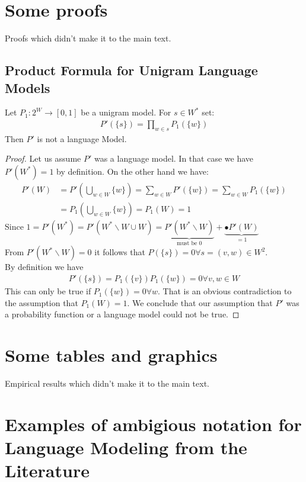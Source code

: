 \documentclass[•]{book}
\begin{document}
\begin{appendix}
\chapter{Some proofs}\label{a:proofs}
Proofs which didn't make it to the main text.
\section*{Product Formula for Unigram Language Models}
\begin{theorem}
Let $P_1:2^W\longrightarrow[0,1]$ be a unigram model. For $s\in W^{*}$ set:
\begin{align}
P'(\{s\})= \prod_{w\in s}P_1(\{w\})
\end{align} 
Then $P'$ is not a language Model.
\end{theorem}
\begin{proof}
Let us assume $P'$ was a language model. In that case we have  $P'(W^{*}) =1$ by definition. On the other hand we have:
\begin{align}
P'(W) & = P'(\bigcup_{w\in W}\{w\})= \sum_{w\in W}P'(\{w\}) = \sum_{w\in W}P_1(\{w\}) \\
 & = P_1(\bigcup_{w\in W}\{w\})= P_1(W) = 1
\end{align}
Since $1 = P'(W^{*}) = P'(W^{*}\backslash W \cup W)= \underbrace{ P'(W^{*}\backslash W)}_{\text{must be }0} + \underbrace{•P'(W)}_{=1}$  \\
From $P'(W^{*}\backslash W)=0$ it follows that $P(\{s\}) = 0 \forall s=(v,w)\in W^2$.\\
By definition we have 
\begin{align}
P'(\{s\})=P_1(\{v\})P_1(\{w\})  = 0 \forall v,w \in W
\end{align}
This can only be true if $P_1(\{w\}) = 0 \forall w$. That is an obvious contradiction to the assumption that $P_1(W)=1$. We conclude that our assumption that $P'$ was a probability function or a language model could not be true.
\end{proof}

\chapter{Some tables and graphics}
Empirical results which didn't make it to the main text.

\chapter{Examples of ambigious notation for Language Modeling from the Literature}\label{a:ambigiousNotation}


\end{appendix}
\end{document}
